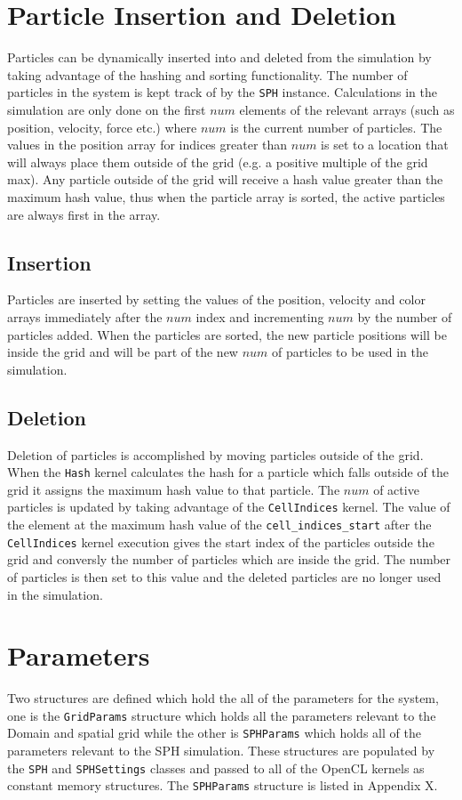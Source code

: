 \section{Particle Insertion and Deletion}
Particles can be dynamically inserted into and deleted from the simulation by
taking advantage of the hashing and sorting functionality. The number of
particles in the system is kept track of by the \verb|SPH| instance.
Calculations in the simulation are only done on the first $num$ elements of the
relevant arrays (such as position, velocity, force etc.) where $num$ is the
current number of particles. The values in the position array for indices
greater than $num$ is set to a location that will always place them outside of
the grid (e.g. a positive multiple of the grid max). Any particle outside of
the grid will receive a hash value greater than the maximum hash value, thus
when the particle array is sorted, the active particles are always first in the
array. 

\subsection{Insertion}
Particles are inserted by setting the values of the position, velocity and
color arrays immediately after the $num$ index and incrementing $num$ by the
number of particles added. When the particles are sorted, the new particle
positions will be inside the grid and will be part of the new $num$ of
particles to be used in the simulation.

\subsection{Deletion}
Deletion of particles is accomplished by moving particles outside of the grid.
When the \verb|Hash| kernel calculates the hash for a particle which falls
outside of the grid it assigns the maximum hash value to that particle.
The $num$ of active particles is updated by taking advantage of the
\verb|CellIndices| kernel. The value of the element at the maximum hash value
of the \verb|cell_indices_start| after the \verb|CellIndices| kernel execution
gives the start index of the particles outside the grid and conversly the
number of particles which are inside the grid. The number of particles is then
set to this value and the deleted particles are no longer used in the
simulation.

\section{Parameters}
Two structures are defined which hold the all of the parameters for the system,
one is the \verb|GridParams| structure which holds all the parameters relevant
to the Domain and spatial grid while the other is \verb|SPHParams| which holds
all of the parameters relevant to the SPH simulation. These structures are
populated by the \verb|SPH| and \verb|SPHSettings| classes and passed to all of
the OpenCL kernels as constant memory structures. The \verb|SPHParams|
structure is listed in Appendix X.


